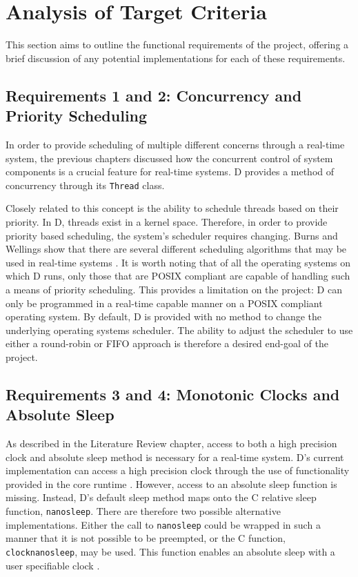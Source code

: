 \section{Analysis of Target Criteria} %
This section aims to outline the functional requirements of the project,
offering a brief discussion of any potential implementations for each of these 
requirements. 

\subsection{Requirements 1 and 2: Concurrency and Priority Scheduling} %
In order to provide scheduling of multiple different concerns through a
real-time system, the previous chapters discussed how the concurrent control of
system components is a crucial feature for real-time systems. D provides a
method of concurrency through its \texttt{Thread} class. 
\par\bigskip\noindent
Closely related to this concept is the ability to schedule threads based on
their priority. In D, threads exist in a kernel space. Therefore, in order to
provide priority based scheduling, the system's scheduler requires changing. Burns
and Wellings show that there are several different scheduling algorithms that
may be used in real-time systems \cite{real-time-systems}. It is worth noting
that of all the operating systems on which D runs, only those that are POSIX
compliant are capable of handling such a means of priority scheduling. This
provides a limitation on the project: D can only be programmed in a real-time
capable manner on a POSIX compliant operating system.
By default, D is provided with no method to change the underlying operating
systems scheduler. 
The ability to adjust the scheduler to use either a round-robin or FIFO approach 
is therefore a desired end-goal of the project.

\subsection{Requirements 3 and 4: Monotonic Clocks and Absolute Sleep} %
As described in the Literature Review chapter, access to both a high precision
clock and absolute sleep method is necessary for a real-time system. D's
current implementation can access a high precision clock through the use of
functionality provided in the core runtime \cite{dlang-core-time}. However,
access to an absolute sleep function is missing. Instead, D's default sleep
method maps onto the C relative sleep function, \texttt{nanosleep}. There are
therefore two possible alternative implementations. Either the call to
\texttt{nanosleep} could be wrapped in such a manner that it is not possible to be preempted, 
or the C function, \texttt{clock\textunderscore{}nanosleep}, may be used. This function enables 
an absolute sleep with a user specifiable clock \cite{clock-nanosleep}. 

